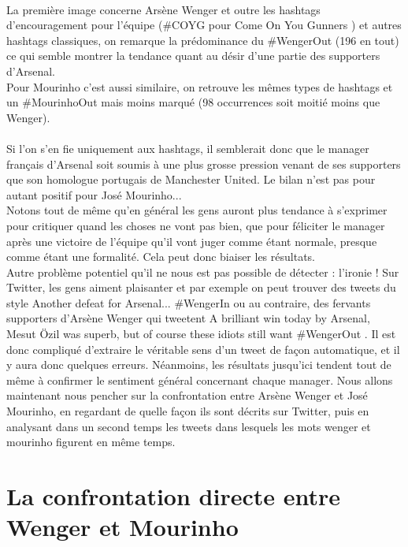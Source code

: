 \documentclass[14pt, openany]{article}
\begin{document}
\paragraph{}
La première image concerne Arsène Wenger et outre les hashtags d'encouragement pour l'équipe (\#COYG pour \og Come On You Gunners \fg{}) et autres hashtags classiques, on remarque la prédominance du \#WengerOut (196 en tout) ce qui semble montrer la tendance quant au désir d'une partie des supporters d'Arsenal.\\
Pour Mourinho c'est aussi similaire, on retrouve les mêmes types de hashtags et un \#MourinhoOut mais moins marqué (98 occurrences soit moitié moins que Wenger).
\paragraph{}
Si l'on s'en fie uniquement aux hashtags, il semblerait donc que le manager français d'Arsenal soit soumis à une plus grosse pression venant de ses supporters que son homologue portugais de Manchester United. Le bilan n'est pas pour autant positif pour José Mourinho...\\
Notons tout de même qu'en général les gens auront plus tendance à s'exprimer pour critiquer quand les choses ne vont pas bien, que pour féliciter le manager après une victoire de l'équipe qu'il vont juger comme étant normale, presque comme étant une formalité. Cela peut donc biaiser les résultats.\\
Autre problème potentiel qu'il ne nous est pas possible de détecter : l'ironie ! Sur Twitter, les gens aiment plaisanter et par exemple on peut trouver des tweets du style \og Another defeat for Arsenal... \#WengerIn \fg{} ou au contraire, des fervants supporters d'Arsène Wenger qui tweetent \og A brilliant win today by Arsenal, Mesut Özil was superb, but of course these idiots still want \#WengerOut \fg{}. Il est donc compliqué d'extraire le véritable sens d'un tweet de façon automatique, et il y aura donc quelques erreurs. Néanmoins, les résultats jusqu'ici tendent tout de même à confirmer le sentiment général concernant chaque manager. Nous allons maintenant nous pencher sur la confrontation entre Arsène Wenger et José Mourinho, en regardant de quelle façon ils sont décrits sur Twitter, puis en analysant dans un second temps les tweets dans lesquels les mots \og wenger \fg{} et \og mourinho \fg{} figurent en même temps.
\section{La confrontation directe entre Wenger et Mourinho}
\end{document}
